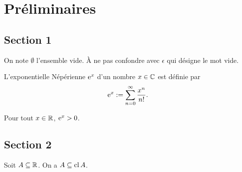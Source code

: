 \chapter{Préliminaires}
\label{ch:prelim}


\section{Section 1}

On note $\emptyset$ l'ensemble vide.  À ne pas confondre avec
$\epsilon$ qui désigne le mot vide.

\begin{definition}
  \label{def:expo}
  L'exponentielle Népérienne $\e^x$ d'un nombre $x \in \IC$ est
  définie par
  \begin{equation}
    \label{eq:exp}
    \e^x := \sum_{n=0}^\infty \frac{x^n}{n!}.
  \end{equation}
\end{definition}

\begin{proposition}
  \label{pos-expo}
  Pour tout $x \in \IR$, $\e^x > 0$.
\end{proposition}


\section{Section 2}

\begin{lemma}
  \label{closure}
  Soit $A \subseteq \IR$.  On a $A \subseteq \cl A$.
\end{lemma}



\endinput
